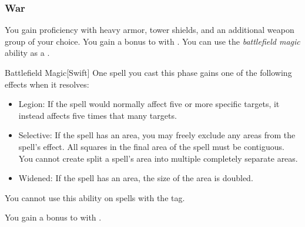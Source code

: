         \subsubsection{War}
             You gain proficiency with heavy armor, tower shields, and an additional weapon group of your choice.
             You gain a  bonus to  with .
             You can use the \textit{battlefield magic} ability as a .
            \begin{apability}{Battlefield Magic}[Swift]
                One spell you cast this phase gains one of the following effects when it resolves:
                \begin{itemize}
                    \item Legion: If the spell would normally affect five or more specific targets, it instead affects five times that many targets.
                    \item Selective: If the spell has an area, you may freely exclude any areas from the spell's effect.
                    All squares in the final area of the spell must be contiguous.
                    You cannot create split a spell's area into multiple completely separate areas.
                    \item Widened: If the spell has an area, the size of the area is doubled.
                \end{itemize}
                You cannot use this ability on spells with the  tag.
            \end{apability}
             You gain a  bonus to  with .

